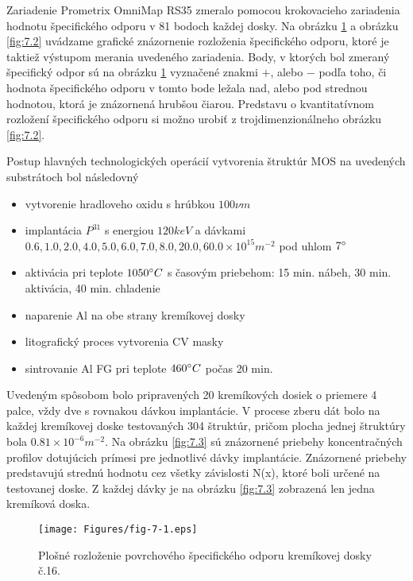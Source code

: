 Zariadenie Prometrix OmniMap RS35 zmeralo pomocou krokovacieho
zariadenia hodnotu špecifického odporu v 81 bodoch každej dosky. Na
obrázku \ref{fig:7.1} a obrázku \ref{fig:7.2} uvádzame grafické
znázornenie rozloženia špecifického odporu, ktoré je taktiež výstupom
merania uvedeného zariadenia. Body, v ktorých bol zmeraný špecifický
odpor sú na obrázku \ref{fig:7.1} vyznačené znakmi $+$, alebo $-$
podľa toho, či hodnota špecifického odporu v tomto bode ležala nad,
alebo pod strednou hodnotou, ktorá je znázornená hrubšou čiarou.
Predstavu o kvantitatívnom rozložení špecifického odporu si možno
urobiť z trojdimenzionálneho obrázku \ref{fig:7.2}.

Postup hlavných technologických operácií vytvorenia štruktúr MOS na
uvedených substrátoch bol následovný

\begin{itemize}
\item vytvorenie hradloveho oxidu s hrúbkou $100 \nu m$
\item implantácia $P^{31}$ s energiou $120 keV$ a dávkami $0.6, 1.0,
  2.0, 4.0, 5.0, 6.0, 7.0, 8.0, 20.0, 60.0 \times 10^{15} m^{-2}$ pod
  uhlom $7\degree$
\item aktivácia pri teplote $1050 \degree C$ s časovým priebehom: 15
  min. nábeh, 30 min. aktivácia, 40 min. chladenie
\item naparenie Al na obe strany kremíkovej dosky
\item litografický proces vytvorenia CV masky
\item sintrovanie Al FG pri teplote $460 \degree C$ počas 20 min.
\end{itemize}

Uvedeným spôsobom bolo pripravených 20 kremíkových dosiek o priemere 4
palce, vždy dve s rovnakou dávkou implantácie.  V procese zberu dát
bolo na každej kremíkovej doske testovaných 304 štruktúr, pričom
plocha jednej štruktúry bola $0.81 \times 10^{-6} m^{-2}$. Na obrázku
\ref{fig:7.3} sú znázornené priebehy koncentračných profilov
dotujúcich prímesi pre jednotlivé dávky implantácie. Znázornené
priebehy predstavujú strednú hodnotu cez všetky závislosti N(x), ktoré
boli určené na testovanej doske. Z každej dávky je na obrázku
\ref{fig:7.3} zobrazená len jedna kremíková doska.

\begin{figure}[h!]\centering
\texttt{[image: Figures/fig-7-1.eps]}
\captionsetup{justification=raggedright, singlelinecheck=false}
{\caption[Plošné rozloženie povrchového špecifického odporu kremíkovej
    dosky č.16]{Plošné rozloženie povrchového špecifického odporu
    kremíkovej dosky č.16.}\label{fig:7.1}}
\end{figure}


